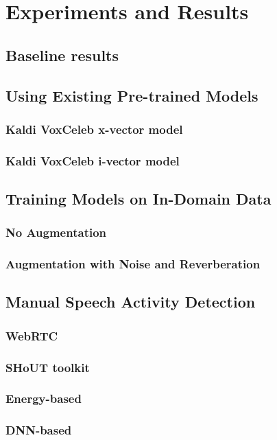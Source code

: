 \chapter{Experiments and Results}

	\section{Baseline results}
	
	\section{Using Existing Pre-trained Models}
		\subsection{Kaldi VoxCeleb x-vector model}
		\subsection{Kaldi VoxCeleb i-vector model}
	
	\section{Training Models on In-Domain Data}
		\subsection{No Augmentation}
		\subsection{Augmentation with Noise and Reverberation}
		
	\section{Manual Speech Activity Detection}
		\subsection{WebRTC}
		\subsection{SHoUT toolkit}
		\subsection{Energy-based}
		\subsection{DNN-based}
		

